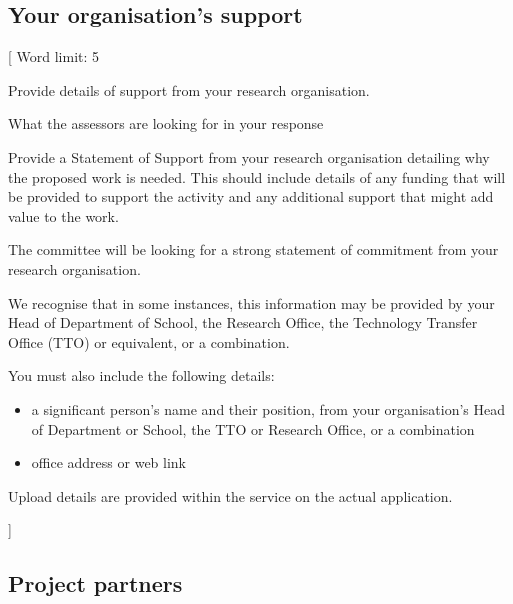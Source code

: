 \documentclass{article}
\newcommand{\desc}[1]{{\leavevmode\color{blue}[#1]}}
\begin{document}
% 

\subsection{Your organisation’s support}

\desc{
Word limit: 5

Provide details of support from your research organisation.

What the assessors are looking for in your response

Provide a Statement of Support from your research organisation detailing why
the proposed work is needed. This should include details of any funding that
will be provided to support the activity and any additional support that might
add value to the work.

The committee will be looking for a strong statement of commitment from your
research organisation.

We recognise that in some instances, this information may be provided by your
Head of Department of School, the Research Office, the Technology Transfer
Office (TTO) or equivalent, or a combination.

You must also include the following details:

\begin{itemize}

    \item a significant person’s name and their position, from your organisation’s Head of
Department or School, the TTO or Research Office, or a combination

    \item office address or web link

\end{itemize}

Upload details are provided within the service on the actual application.

}

\subsection{Project partners}
\end{document}
